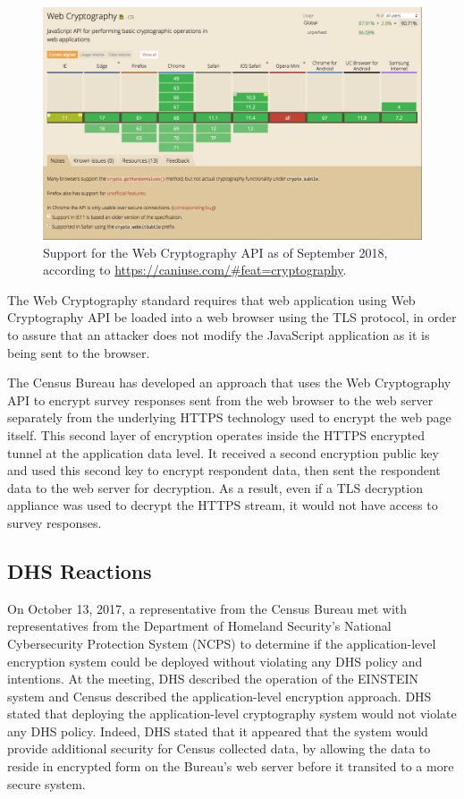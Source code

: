 \documentclass[fleqn,10pt]{wlscirep}
\begin{document}
\begin{figure}
  \includegraphics[width=\linewidth]{art/caniuse}
  \caption{Support for the Web Cryptography API as of September 2018,
    according to \url{https://caniuse.com/\#feat=cryptography}.\label{caniuse}}
\end{figure}

The Web Cryptography standard requires that web application using Web
Cryptography API be loaded into a web browser using the TLS protocol, in
order to assure that an attacker does not modify the JavaScript
application as it is being sent to the browser.

The Census Bureau has developed an approach that uses the Web
Cryptography API to encrypt survey responses sent from the
web browser to the web server separately from the underlying HTTPS
technology used to encrypt the web page itself. This second layer of encryption
operates inside the HTTPS encrypted tunnel at the application data
level. It received a second encryption public key and used this second
key to encrypt respondent data, then sent the respondent data to the
web server for decryption. As a result, even if a TLS decryption
appliance was used to decrypt the HTTPS stream, it would not have
access to survey responses.

\subsection{DHS Reactions}

On October 13, 2017, a representative from the Census Bureau met with representatives from the
Department of Homeland Security's National Cybersecurity Protection
System (NCPS) to determine if the application-level encryption system
could be deployed without violating any DHS policy and intentions. At
the meeting, DHS described the operation of the EINSTEIN system and
Census described the application-level encryption approach. DHS stated
that deploying the application-level cryptography system would not violate any
DHS policy. Indeed, DHS stated that it appeared that the system would
provide additional security for Census collected data, by allowing the
data to reside in encrypted form on the Bureau's web server before it
transited to a more secure system.
\end{document}
